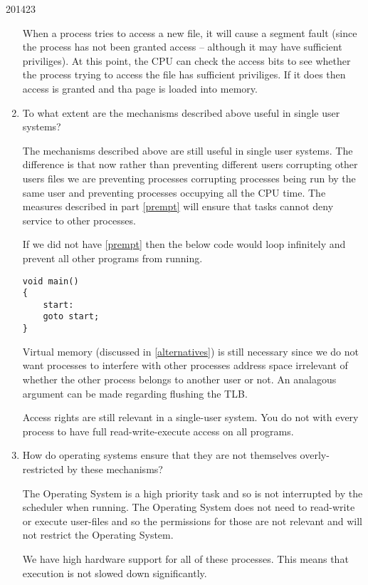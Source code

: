 \documentclass[10pt,\jkfside,a4paper]{article}
\begin{document}
\begin{examquestion}{2014}{2}{3}
\begin{enumerate}
When a process tries to access a new file, it will cause a segment fault (since the process 
has not been granted access -- although it may have sufficient priviliges). At this point, the 
CPU can check the access bits to see whether the process trying to access the file has sufficient 
priviliges. If it does then access is granted and tha page is loaded into memory. 

\item To what extent are the mechanisms described above useful in single user
systems?

The mechanisms described above are still useful in single user systems. The difference 
is that now rather than preventing different users corrupting other users files 
we are preventing processes corrupting processes being run by the same user and preventing 
processes occupying all the CPU time. The measures described in part \ref{prempt} will ensure 
that tasks cannot deny service to other processes.

If we did not have \ref{prempt} then the below code would loop infinitely and prevent all 
other programs from running.
\begin{lstlisting}[style=cstyle]
void main()
{
	start:
	goto start;
}
\end{lstlisting}


Virtual memory (discussed in \ref{alternatives}) is still necessary since we do not 
want processes to interfere with other processes address space irrelevant of whether the 
other process belongs to another user or not. An analagous argument can be made 
regarding flushing the TLB.

Access rights are still relevant in a single-user system. You do not with every process 
to have full read-write-execute access on all programs.

\item How do operating systems ensure that they are not themselves overly-restricted
by these mechanisms?

The Operating System is a high priority task and so is not interrupted by the scheduler 
when running. The Operating System does not need to read-write or execute user-files 
and so the permissions for those are not relevant and will not restrict the Operating System. 

We have high hardware support for all of these processes. This means that execution is not 
slowed down significantly.

\end{enumerate}

\end{examquestion}
\end{document}
